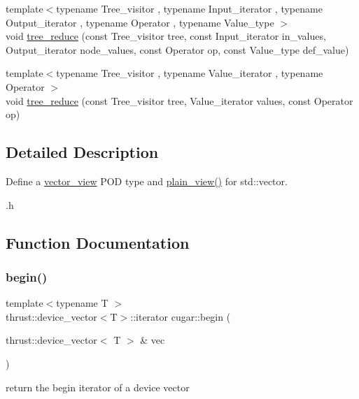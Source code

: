 \begin{DoxyCompactItemize}
\item 
{\footnotesize template$<$typename Tree\+\_\+visitor , typename Input\+\_\+iterator , typename Output\+\_\+iterator , typename Operator , typename Value\+\_\+type $>$ }\\void \hyperlink{group___trees_module_gaf7e2c5b8c843cd382db2d1b23c981694}{tree\+\_\+reduce} (const Tree\+\_\+visitor tree, const Input\+\_\+iterator in\+\_\+values, Output\+\_\+iterator node\+\_\+values, const Operator op, const Value\+\_\+type def\+\_\+value)
\item 
{\footnotesize template$<$typename Tree\+\_\+visitor , typename Value\+\_\+iterator , typename Operator $>$ }\\void \hyperlink{group___trees_module_ga808e7cb4b98d8dc0c3ef125ca457cb68}{tree\+\_\+reduce} (const Tree\+\_\+visitor tree, Value\+\_\+iterator values, const Operator op)
\end{DoxyCompactItemize}


\subsection{Detailed Description}
Define a \hyperlink{structcugar_1_1vector__view}{vector\+\_\+view} P\+OD type and \hyperlink{namespacecugar_a347f91de482f0cb8dcba21c086b0aa46}{plain\+\_\+view()} for std\+::vector. 

.h 

\subsection{Function Documentation}
\mbox{\label{namespacecugar_a2121df08f967e232ea5fe0ee378dee67}} 
\subsubsection{\texorpdfstring{begin()}{begin()}\hspace{0.1cm}{\footnotesize\ttfamily [1/4]}}
{\footnotesize\ttfamily template$<$typename T $>$ \\
thrust\+::device\+\_\+vector$<$T$>$\+::iterator cugar\+::begin (\begin{DoxyParamCaption}\item[{thrust\+::device\+\_\+vector$<$ T $>$ \&}]{vec }\end{DoxyParamCaption})}

return the begin iterator of a device vector \mbox{\label{namespacecugar_a30af53814c4976acd3bacabbbd2993fa}} 
